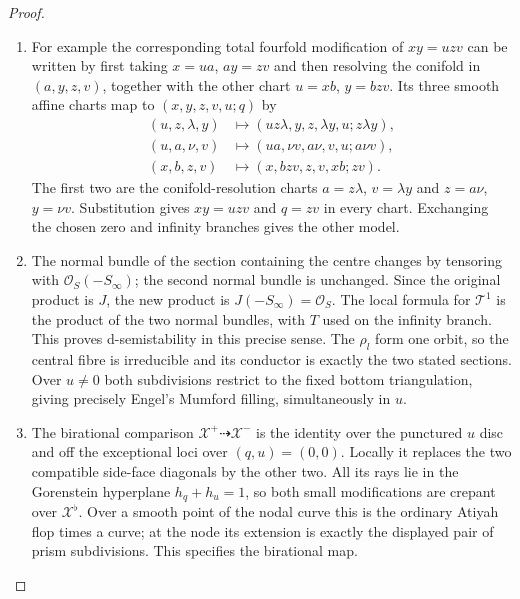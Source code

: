 \begin{proof}
\begin{enumerate}[label=\arabic*.,leftmargin=*]
\item For example the corresponding total fourfold modification of
$xy=uzv$ can be written by first taking $x=ua$, $ay=zv$ and
then resolving the conifold in $(a,y,z,v)$, together with the
other chart $u=xb$, $y=bzv$. Its three smooth affine charts map
to $(x,y,z,v,u;q)$ by
\[
\begin{aligned}
 (u,z,\lambda,y)&\longmapsto(uz\lambda,y,z,\lambda y,u;z\lambda y),\\
 (u,a,\nu,v)&\longmapsto(ua,\nu v,a\nu,v,u;a\nu v),\\
 (x,b,z,v)&\longmapsto(x,bzv,z,v,xb;zv).
\end{aligned}
\]
The first two are the conifold-resolution charts
$a=z\lambda$, $v=\lambda y$ and $z=a\nu$, $y=\nu v$.
Substitution gives $xy=uzv$ and $q=zv$ in every chart.
Exchanging the chosen zero and infinity branches gives the other model.

\item The normal bundle of the section containing the centre changes
by tensoring with $\mathcal O_S(-S_\infty)$; the second normal
bundle is unchanged. Since the original product is $J$, the
new product is $J(-S_\infty)=\mathcal O_S$. The local
formula for $\mathcal T^1$ is the product of the two normal
bundles, with $T$ used on the infinity branch. This proves
d-semistability in this precise sense. The $\rho_l$ form one
orbit, so the central fibre is irreducible and its conductor is
exactly the two stated sections. Over $u\ne0$ both subdivisions
restrict to the fixed bottom triangulation, giving precisely
Engel's Mumford filling, simultaneously in $u$.

\item The birational comparison $\mathcal X^+\dashrightarrow
\mathcal X^-$ is the identity over the punctured $u$ disc and
off the exceptional loci over $(q,u)=(0,0)$. Locally it replaces
the two compatible side-face diagonals by the other two.
All its rays lie in the Gorenstein hyperplane $h_q+h_u=1$,
so both small modifications are crepant over
$\mathcal X^\flat$. Over a smooth point of the nodal curve
this is the ordinary Atiyah flop times a curve; at the node its
extension is exactly the displayed pair of prism subdivisions.
This specifies the birational map.
\end{enumerate}
\end{proof}
